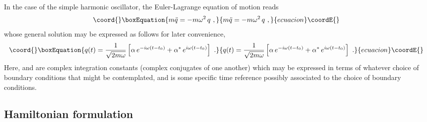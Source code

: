 \documentclass[a4paper,11pt]{article}
\begin{document}
In the case of the simple harmonic oscillator, the Euler-Lagrange equation
of motion reads
\begin{equation}\coord{}\boxEquation{
m\ddot{q}=-m\omega^2\,q\ ,
}{
m\ddot{q}=-m\omega^2\,q\ ,
}{ecuacion}\coordE{}\end{equation}
whose general solution may be expressed as follows for later
convenience,
\begin{equation}\coord{}\boxEquation{
q(t)=\frac{1}{\sqrt{2m\omega}}
\left[\alpha\,e^{-i\omega(t-t_0)}+\alpha^*\,e^{i\omega(t-t_0)}\right]\ .
}{
q(t)=\frac{1}{\sqrt{2m\omega}}
\left[\alpha\,e^{-i\omega(t-t_0)}+\alpha^*\,e^{i\omega(t-t_0)}\right]\ .
}{ecuacion}\coordE{}\end{equation}
Here, \myHighlight{$\alpha$}\coordHE{} and \myHighlight{$\alpha^*$}\coordHE{} are complex integration constants (complex
conjugates of one another) which may be expressed in terms of whatever
choice of boundary conditions that might be contemplated, and \coordHE{}
is some specific time reference possibly associated to the choice of
boundary conditions.

\subsection{Hamiltonian formulation}
\label{Subsect2.2}
\end{document}
